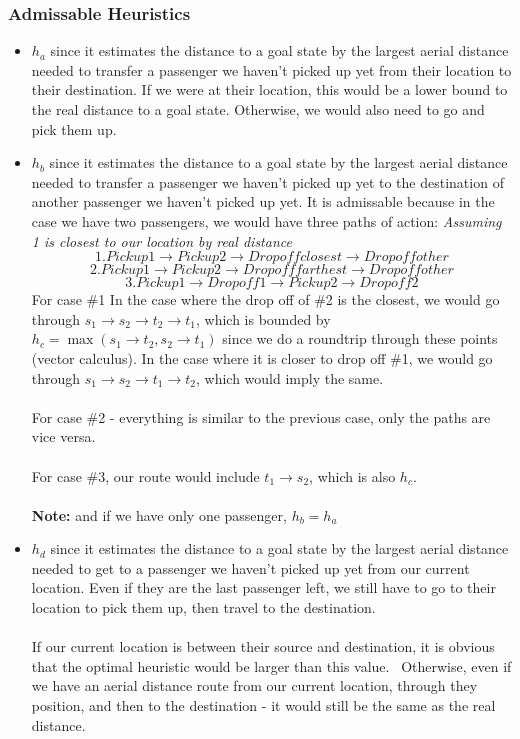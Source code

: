 \documentclass{article}
\begin{document}
\subsubsection*{Admissable Heuristics}
\begin{itemize}
\item $h_a$ since it estimates the distance to a goal state by the largest aerial distance needed to transfer a passenger we haven't picked up yet from their location to their destination. If we were at their location, this would be a lower bound to the real distance to a goal state. Otherwise, we would also need to go and pick them up.

\item $h_b$ since it estimates the distance to a goal state by the largest aerial distance needed to transfer a passenger we haven't picked up yet to the destination of another passenger we haven't picked up yet. It is admissable because in the case we have two passengers, we would have three paths of action: \emph{Assuming 1 is closest to our location by real distance}
$$
	1. Pick up 1 \rightarrow Pick up 2 \rightarrow Drop off closest \rightarrow Drop off other
$$
$$
	2. Pick up 1 \rightarrow Pick up 2 \rightarrow Drop off farthest \rightarrow Drop off other
$$
$$
	3. Pick up 1 \rightarrow Drop off 1  \rightarrow Pick up 2 \rightarrow Drop off 2
$$
For case \#1 In the case where the drop off of \#2 is the closest, we would go through $s_1 \rightarrow s_2\rightarrow t_2 \rightarrow t_1$, which is bounded by $h_c = \max (s_1\rightarrow t_2, s_2 \rightarrow t_1)$ since we do a roundtrip through these points (vector calculus). In the case where it is closer to drop off \#1, we would go through $s_1 \rightarrow s_2 \rightarrow t_1 \rightarrow t_2$, which would imply the same. \\~\\
For case \#2 - everything is similar to the previous case, only the paths are vice versa. \\~\\
For case \#3, our route would include $t_1 \rightarrow s_2$, which is also $h_c$. \\~\\
\textbf{Note:} and if we have only one passenger, $h_b = h_a$

\item $h_d$ since it estimates the distance to a goal state by the largest aerial distance needed to get to a passenger we haven't picked up yet from our current location. Even if they are the last passenger left, we still have to go to their  location to pick them up, then travel to the destination. \\~\\
If our current location is between their source and destination, it is obvious that the optimal heuristic would be larger than this value. \ 
Otherwise, even if we have an aerial distance route from our current location, through they position, and then to the destination - it would still be the same as the real distance.


\end{itemize}
\end{document}
